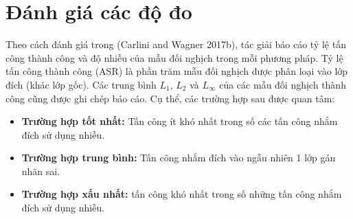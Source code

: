 \section{Đánh giá các độ đo}
Theo cách đánh giá trong (Carlini and Wagner 2017b), tác giải báo cáo tỷ lệ tấn công thành công và độ nhiễu của mẫu đối nghịch trong mỗi phương pháp. Tỷ lệ tấn công thành công (ASR) là phần trăm mẫu đối nghịch được phân loại vào lớp đích (khác lớp gốc). Các trung bình $L_1$, $L_2$ và $L_{\infty}$ của các mẫu đối nghịch thành công cũng được ghi chép báo cáo. Cụ thể, các trường hợp sau được quan tâm:
\begin{itemize}
    \item \textbf{Trường hợp tốt nhất:} Tấn công ít khó nhất trong số các tấn công nhắm đích sử dụng nhiễu.
    \item \textbf{Trường hợp trung bình:} Tấn công nhắm đích vào ngẫu nhiên 1 lớp gán nhãn sai.
    \item \textbf{Trường hợp xấu nhất:} tấn công khó nhất trong số những tấn công nhắm đích sử dụng nhiễu.
\end{itemize}
